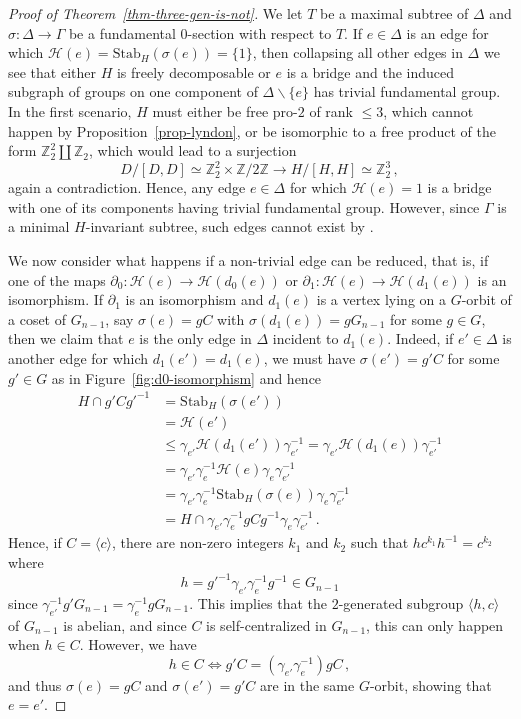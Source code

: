 \documentclass[a4paper]{amsart}
\theoremstyle{definition}
\begin{document}
\begin{proof}[Proof of Theorem~\ref{thm-three-gen-is-not}]
We let \(T\) be a maximal subtree of \(\Delta\) and \(\sigma\colon \Delta \to \Gamma\) be a fundamental \(0\)-section with respect to \(T\). If \(e \in \Delta\) is an edge for which \(\mathcal{H}(e) = \mathrm{Stab}_H(\sigma(e)) = \{1\}\), then collapsing all other edges in \(\Delta\) we see that either \(H\) is freely decomposable or \(e\) is a bridge and the induced subgraph of groups on one component of \(\Delta \smallsetminus \{e\}\) has trivial fundamental group. In the first scenario, \(H\) must either be free pro-\(2\) of rank \(\leq 3\), which cannot happen by Proposition~\ref{prop-lyndon}, or be isomorphic to a free product of the form \(\mathbb{Z}_2^2 \amalg \mathbb{Z}_2\), which would lead to a surjection \[D/[D,D] \simeq \mathbb{Z}_2^2 \times \mathbb{Z}/2\mathbb{Z} \to H/[H,H] \simeq \mathbb{Z}_2^3\,,\] again a contradiction. Hence, any edge \(e \in \Delta\) for which \(\mathcal{H}(e) = 1\) is a bridge with one of its components having trivial fundamental group. However, since \(\Gamma\) is a minimal \(H\)-invariant subtree, such edges cannot exist by \cite[Lem. 3.1]{KZ2025}.

We now consider what happens if a non-trivial edge can be reduced, that is, if one of the maps \(\partial_0\colon \mathcal{H}(e) \to \mathcal{H}(d_0(e))\) or \(\partial_1\colon \mathcal{H}(e) \to \mathcal{H}(d_1(e))\) is an isomorphism. If \(\partial_1\) is an isomorphism and \(d_1(e)\) is a vertex lying on a \(G\)-orbit of a coset of \(G_{n-1}\), say \(\sigma(e) = gC\) with \(\sigma(d_1(e)) = gG_{n-1}\) for some \(g \in G\), then we claim that \(e\) is the only edge in \(\Delta\) incident to  \(d_1(e)\). Indeed, if \(e' \in \Delta\) is another edge for which \(d_1(e') = d_1(e)\), we must have \(\sigma(e') = g'C\) for some \(g' \in G\) as in Figure~\ref{fig:d0-isomorphism} and hence 
\begin{align*}
    H \cap g'C{g'}^{-1} &= \mathrm{Stab}_H(\sigma(e'))\\
    &= \mathcal{H}(e')\\
    &\leq \gamma_{e'}\mathcal{H}(d_1(e'))\gamma_{e'}^{-1} = \gamma_{e'}\mathcal{H}(d_1(e))\gamma_{e'}^{-1}\\
    &= \gamma_{e'}\gamma_e^{-1}\mathcal{H}(e)\gamma_e\gamma_{e'}^{-1}\\
    &= \gamma_{e'}\gamma_e^{-1}\mathrm{Stab}_H(\sigma(e))\gamma_e\gamma_{e'}^{-1}\\
    &= H\cap \gamma_{e'}\gamma_e^{-1}gCg^{-1}\gamma_e\gamma_{e'}^{-1}\,.
\end{align*}
Hence, if \(C = \langle c \rangle\), there are non-zero integers \(k_1\) and \(k_2\) such that \(hc^{k_1}h^{-1} = c^{k_2}\) where \[h = g'^{-1}\gamma_{e'}\gamma_e^{-1}g^{-1} \in G_{n-1}\] since \(\gamma_{e'}^{-1}g'G_{n-1} = \gamma_e^{-1}gG_{n-1}\). This implies that the \(2\)-generated subgroup \(\langle h, c\rangle\) of \(G_{n-1}\) is abelian, and since \(C\) is self-centralized in \(G_{n-1}\), this can only happen when \(h \in C\). However, we have \[h \in C \iff g'C = (\gamma_{e'}\gamma_e^{-1})gC\,,\] and thus \(\sigma(e) = gC\) and \(\sigma(e') = g'C\) are in the same \(G\)-orbit, showing that \(e = e'\).



\end{proof}
\end{document}
